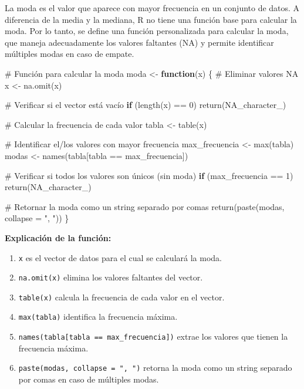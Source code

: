 \documentclass[
  spanish,
  a4paper,
  DIV=11,
  numbers=noendperiod,
  onepage,
  openany]{scrreprt}
\newenvironment{Shaded}{\begin{snugshade}}{\end{snugshade}}
\newcommand{\AttributeTok}[1]{\textcolor[rgb]{0.40,0.45,0.13}{#1}}
\newcommand{\CommentTok}[1]{\textcolor[rgb]{0.37,0.37,0.37}{#1}}
\newcommand{\ConstantTok}[1]{\textcolor[rgb]{0.56,0.35,0.01}{#1}}
\newcommand{\ControlFlowTok}[1]{\textcolor[rgb]{0.00,0.23,0.31}{\textbf{#1}}}
\newcommand{\DecValTok}[1]{\textcolor[rgb]{0.68,0.00,0.00}{#1}}
\newcommand{\FunctionTok}[1]{\textcolor[rgb]{0.28,0.35,0.67}{#1}}
\newcommand{\NormalTok}[1]{\textcolor[rgb]{0.00,0.23,0.31}{#1}}
\newcommand{\OtherTok}[1]{\textcolor[rgb]{0.00,0.23,0.31}{#1}}
\newcommand{\SpecialCharTok}[1]{\textcolor[rgb]{0.37,0.37,0.37}{#1}}
\newcommand{\StringTok}[1]{\textcolor[rgb]{0.13,0.47,0.30}{#1}}
\begin{document}
La moda es el valor que aparece con mayor frecuencia en un conjunto de
datos. A diferencia de la media y la mediana, R no tiene una función
base para calcular la moda. Por lo tanto, se define una función
personalizada para calcular la moda, que maneja adecuadamente los
valores faltantes (NA) y permite identificar múltiples modas en caso de
empate.

\begin{Shaded}
\begin{Highlighting}[]
\CommentTok{\# Función para calcular la moda}
\NormalTok{moda }\OtherTok{\textless{}{-}} \ControlFlowTok{function}\NormalTok{(x) \{}
  \CommentTok{\# Eliminar valores NA}
\NormalTok{  x }\OtherTok{\textless{}{-}} \FunctionTok{na.omit}\NormalTok{(x)}

  \CommentTok{\# Verificar si el vector está vacío}
  \ControlFlowTok{if}\NormalTok{ (}\FunctionTok{length}\NormalTok{(x) }\SpecialCharTok{==} \DecValTok{0}\NormalTok{) }\FunctionTok{return}\NormalTok{(}\ConstantTok{NA\_character\_}\NormalTok{)}

  \CommentTok{\# Calcular la frecuencia de cada valor}
\NormalTok{  tabla }\OtherTok{\textless{}{-}} \FunctionTok{table}\NormalTok{(x)}

  \CommentTok{\# Identificar el/los valores con mayor frecuencia}
\NormalTok{  max\_frecuencia }\OtherTok{\textless{}{-}} \FunctionTok{max}\NormalTok{(tabla)}
\NormalTok{  modas }\OtherTok{\textless{}{-}} \FunctionTok{names}\NormalTok{(tabla[tabla }\SpecialCharTok{==}\NormalTok{ max\_frecuencia])}

  \CommentTok{\# Verificar si todos los valores son únicos (sin moda)}
  \ControlFlowTok{if}\NormalTok{ (max\_frecuencia }\SpecialCharTok{==} \DecValTok{1}\NormalTok{) }\FunctionTok{return}\NormalTok{(}\ConstantTok{NA\_character\_}\NormalTok{)}

  \CommentTok{\# Retornar la moda como un string separado por comas}
  \FunctionTok{return}\NormalTok{(}\FunctionTok{paste}\NormalTok{(modas, }\AttributeTok{collapse =} \StringTok{", "}\NormalTok{))}
\NormalTok{\}}
\end{Highlighting}
\end{Shaded}

\textbf{Explicación de la función:}

\begin{enumerate}
\def\labelenumi{\arabic{enumi}.}
\item
  \texttt{x} es el vector de datos para el cual se calculará la moda.
\item
  \texttt{na.omit(x)} elimina los valores faltantes del vector.
\item
  \texttt{table(x)} calcula la frecuencia de cada valor en el vector.
\item
  \texttt{max(tabla)} identifica la frecuencia máxima.
\item
  \texttt{names(tabla{[}tabla\ ==\ max\_frecuencia{]})} extrae los
  valores que tienen la frecuencia máxima.
\item
  \texttt{paste(modas,\ collapse\ =\ ",\ ")} retorna la moda como un
  string separado por comas en caso de múltiples modas.
\end{enumerate}
\end{document}

